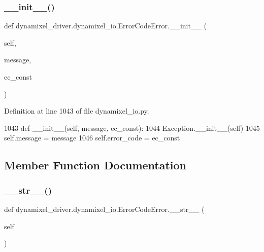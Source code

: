 \subsubsection{\texorpdfstring{\+\_\+\+\_\+init\+\_\+\+\_\+()}{\_\_init\_\_()}}
{\footnotesize\ttfamily def dynamixel\+\_\+driver.\+dynamixel\+\_\+io.\+Error\+Code\+Error.\+\_\+\+\_\+init\+\_\+\+\_\+ (\begin{DoxyParamCaption}\item[{}]{self,  }\item[{}]{message,  }\item[{}]{ec\+\_\+const }\end{DoxyParamCaption})}



Definition at line 1043 of file dynamixel\+\_\+io.\+py.


\begin{DoxyCode}
1043     \textcolor{keyword}{def }\_\_init\_\_(self, message, ec\_const):
1044         Exception.\_\_init\_\_(self)
1045         self.message = message
1046         self.error\_code = ec\_const
\end{DoxyCode}


\subsection{Member Function Documentation}
\mbox{\label{classdynamixel__driver_1_1dynamixel__io_1_1_error_code_error_a32541e7cf5167ab6872b98749262d1bd}} 
\subsubsection{\texorpdfstring{\+\_\+\+\_\+str\+\_\+\+\_\+()}{\_\_str\_\_()}}
{\footnotesize\ttfamily def dynamixel\+\_\+driver.\+dynamixel\+\_\+io.\+Error\+Code\+Error.\+\_\+\+\_\+str\+\_\+\+\_\+ (\begin{DoxyParamCaption}\item[{}]{self }\end{DoxyParamCaption})}



